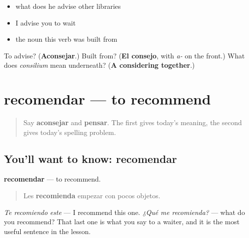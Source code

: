 \begin{itemize}
\raggedright
  \item what does he advise other libraries
  \item I advise you to wait
  \item the noun this verb was built from
\end{itemize}

\begin{tcolorbox}[breakable,colback=teal!4,colframe=teal!35!black,title={Before you move on}]
To advise? (\textbf{Aconsejar}.) Built from? (\textbf{El consejo}, with \emph{a-} on the front.) What does \emph{consilium} mean underneath? (\textbf{A considering together}.)
\end{tcolorbox}
\section[recomendar]{recomendar — to recommend}

\label{lesson:ES-C473-recomendar}



\begin{quote}
Say \textbf{aconsejar} and \textbf{pensar}. The first gives today's meaning, the second gives today's spelling problem.
\end{quote}

\subsection*{You'll want to know: recomendar}
\textbf{recomendar} — to recommend.

\begin{quote}
Les \textbf{recomienda} empezar con pocos objetos.
\end{quote}

\emph{Te recomiendo este} — I recommend this one. \emph{¿Qué me recomienda?} — what do you recommend? That last one is what you say to a waiter, and it is the most useful sentence in the lesson.

